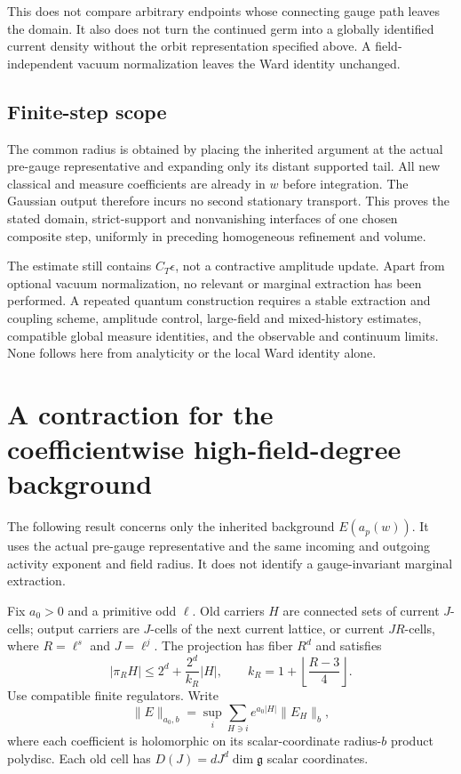 \documentclass[11pt]{article}
\theoremstyle{remark}
\begin{document}
This does not compare arbitrary endpoints whose
connecting gauge path leaves the domain. It also does
not turn the continued germ into a globally identified
current density without the orbit representation
specified above. A field-independent vacuum
normalization leaves the Ward identity unchanged.

\subsection{Finite-step scope}
\label{cdm-scope}

The common radius is obtained by placing the inherited
argument at the actual pre-gauge representative and
expanding only its distant supported tail. All new
classical and measure coefficients are already in
$w$ before integration. The Gaussian output therefore
incurs no second stationary transport. This proves
the stated domain, strict-support and nonvanishing
interfaces of one chosen composite step, uniformly
in preceding homogeneous refinement and volume.

The estimate still contains $C_T\epsilon$, not a
contractive amplitude update. Apart from optional
vacuum normalization, no relevant or marginal
extraction has been performed. A repeated quantum
construction requires a stable extraction and coupling
scheme, amplitude control, large-field and
mixed-history estimates, compatible global measure
identities, and the observable and continuum limits.
None follows here from analyticity or the local
Ward identity alone.

\section{A contraction for the coefficientwise high-field-degree background}
\label{cdh-section}

The following result concerns only the inherited background
$E(a_p(w))$. It uses the actual pre-gauge representative and the
same incoming and outgoing activity exponent and field radius.
It does not identify a gauge-invariant marginal extraction.

Fix $a_0>0$ and a primitive odd $\ell$. Old carriers $H$ are
connected sets of current $J$-cells; output carriers are
$J$-cells of the next current lattice, or current $JR$-cells,
where $R=\ell^s$ and $J=\ell^j$. The projection has fiber $R^d$
and satisfies
\begin{equation}
 |\pi_RH|\leq2^d+\frac{2^d}{k_R}|H|,
 \qquad k_R=1+\left\lfloor\frac{R-3}{4}\right\rfloor.
 \label{cdh-compression}
\end{equation}
Use compatible finite regulators. Write
\begin{equation}
 \|E\|_{a_0,b}
 =\sup_i\sum_{H\ni i}e^{a_0|H|}\|E_H\|_b,
 \label{cdh-input-norm}
\end{equation}
where each coefficient is holomorphic on its scalar-coordinate
radius-$b$ product polydisc. Each old cell has
$D(J)=dJ^d\dim\mathfrak g$ scalar coordinates.
\end{document}
